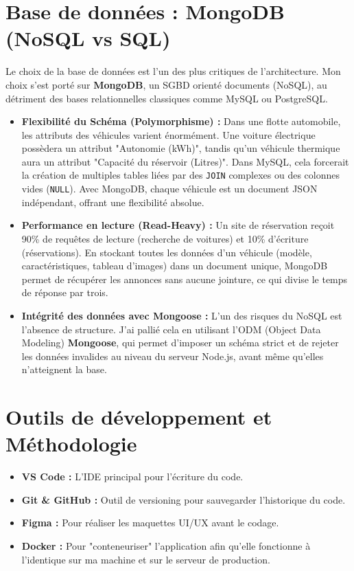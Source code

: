\section{Base de données : MongoDB (NoSQL vs SQL)}
Le choix de la base de données est l'un des plus critiques de l'architecture. Mon choix s'est porté sur \textbf{MongoDB}, un SGBD orienté documents (NoSQL), au détriment des bases relationnelles classiques comme MySQL ou PostgreSQL.
\begin{itemize}
    \item \textbf{Flexibilité du Schéma (Polymorphisme) :} Dans une flotte automobile, les attributs des véhicules varient énormément. Une voiture électrique possèdera un attribut "Autonomie (kWh)", tandis qu'un véhicule thermique aura un attribut "Capacité du réservoir (Litres)". Dans MySQL, cela forcerait la création de multiples tables liées par des \texttt{JOIN} complexes ou des colonnes vides (\texttt{NULL}). Avec MongoDB, chaque véhicule est un document JSON indépendant, offrant une flexibilité absolue.
    \item \textbf{Performance en lecture (Read-Heavy) :} Un site de réservation reçoit 90\% de requêtes de lecture (recherche de voitures) et 10\% d'écriture (réservations). En stockant toutes les données d'un véhicule (modèle, caractéristiques, tableau d'images) dans un document unique, MongoDB permet de récupérer les annonces sans aucune jointure, ce qui divise le temps de réponse par trois.
    \item \textbf{Intégrité des données avec Mongoose :} L'un des risques du NoSQL est l'absence de structure. J'ai pallié cela en utilisant l'ODM (Object Data Modeling) \textbf{Mongoose}, qui permet d'imposer un schéma strict et de rejeter les données invalides au niveau du serveur Node.js, avant même qu'elles n'atteignent la base.
\end{itemize}

\section{Outils de développement et Méthodologie}
\begin{itemize}
    \item \textbf{VS Code :} L'IDE principal pour l'écriture du code.
    \item \textbf{Git \& GitHub :} Outil de versioning pour sauvegarder l'historique du code.
    \item \textbf{Figma :} Pour réaliser les maquettes UI/UX avant le codage.
    \item \textbf{Docker :} Pour "conteneuriser" l'application afin qu'elle fonctionne à l'identique sur ma machine et sur le serveur de production.
\end{itemize}

